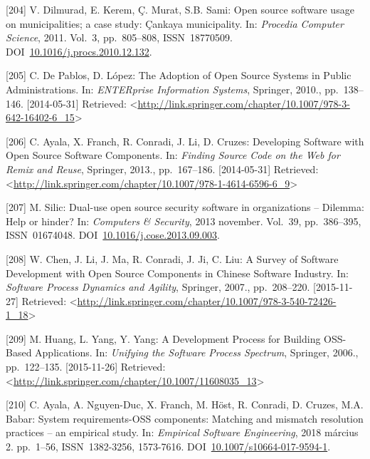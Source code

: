 \documentclass[12pt,magyar,a4paper,oneside]{scrreprt}
\begin{document}
\leavevmode\hypertarget{ref-dilmurad_open_2011}{}%
{[}204{]} V. Dilmurad, E. Kerem, Ç. Murat, S.B. Sami: Open source
software usage on municipalities; a case study: Çankaya municipality.
In: \emph{Procedia Computer Science}, 2011. Vol.~3, pp.~805--808,
ISSN~18770509.
DOI~\href{https://doi.org/10.1016/j.procs.2010.12.132}{10.1016/j.procs.2010.12.132}.

\leavevmode\hypertarget{ref-de_pablos_adoption_2010}{}%
{[}205{]} C. De Pablos, D. López: The Adoption of Open Source Systems in
Public Administrations. In: \emph{ENTERprise Information Systems},
Springer, 2010., pp.~138--146. {[}2014-05-31{]} Retrieved:
\textless{}\url{http://link.springer.com/chapter/10.1007/978-3-642-16402-6_15}\textgreater{}

\leavevmode\hypertarget{ref-ayala_developing_2013}{}%
{[}206{]} C. Ayala, X. Franch, R. Conradi, J. Li, D. Cruzes: Developing
Software with Open Source Software Components. In: \emph{Finding Source
Code on the Web for Remix and Reuse}, Springer, 2013., pp.~167--186.
{[}2014-05-31{]} Retrieved:
\textless{}\url{http://link.springer.com/chapter/10.1007/978-1-4614-6596-6_9}\textgreater{}

\leavevmode\hypertarget{ref-silic_dual-use_2013}{}%
{[}207{]} M. Silic: Dual-use open source security software in
organizations -- Dilemma: Help or hinder? In: \emph{Computers \&
Security}, 2013 november. Vol.~39, pp.~386--395, ISSN~01674048.
DOI~\href{https://doi.org/10.1016/j.cose.2013.09.003}{10.1016/j.cose.2013.09.003}.

\leavevmode\hypertarget{ref-chen_survey_2007}{}%
{[}208{]} W. Chen, J. Li, J. Ma, R. Conradi, J. Ji, C. Liu: A Survey of
Software Development with Open Source Components in Chinese Software
Industry. In: \emph{Software Process Dynamics and Agility}, Springer,
2007., pp.~208--220. {[}2015-11-27{]} Retrieved:
\textless{}\url{http://link.springer.com/chapter/10.1007/978-3-540-72426-1_18}\textgreater{}

\leavevmode\hypertarget{ref-huang_development_2006}{}%
{[}209{]} M. Huang, L. Yang, Y. Yang: A Development Process for Building
OSS-Based Applications. In: \emph{Unifying the Software Process
Spectrum}, Springer, 2006., pp.~122--135. {[}2015-11-26{]} Retrieved:
\textless{}\url{http://link.springer.com/chapter/10.1007/11608035_13}\textgreater{}

\leavevmode\hypertarget{ref-ayala_system_2018}{}%
{[}210{]} C. Ayala, A. Nguyen-Duc, X. Franch, M. Höst, R. Conradi, D.
Cruzes, M.A. Babar: System requirements-OSS components: Matching and
mismatch resolution practices -- an empirical study. In: \emph{Empirical
Software Engineering}, 2018 március 2. pp.~1--56, ISSN~1382-3256,
1573-7616.
DOI~\href{https://doi.org/10.1007/s10664-017-9594-1}{10.1007/s10664-017-9594-1}.
\end{document}

